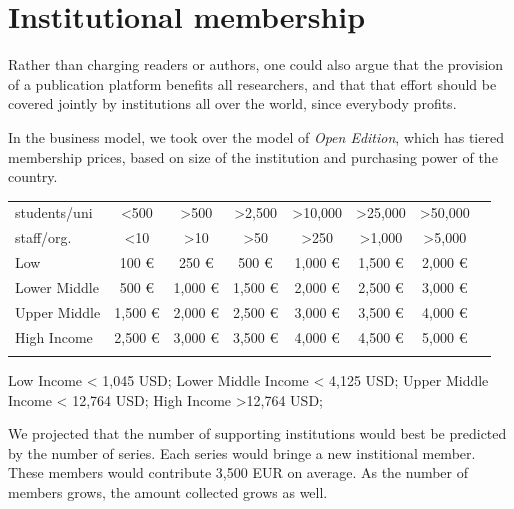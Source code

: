 \documentclass[nonflat,smallfont
]{langsci/langscibook}
\newcommand{\background}[1]{ 
  \vspace{5mm}
  \renewcommand{\tblslinecolour}{lsDarkBlue}
  \tblssy[red]{explore2}{Background}{\vspace*{-5mm}#1}
}
\newcommand{\langscisolution}[1]{
  \renewcommand{\tblslinecolour}{lsLightBlue}
  \tblssy{langsci}{LangSci solution}{\vspace*{-5mm}#1}
}
\renewcommand{\tblssy}[4][black!12]{%
  \renewcommand{\langscisymbol}{#2}\renewcommand{\tblsboxcolor}{#1}
  \begin{mdframed}[style=yellowexercise,frametitle={#3}]
    #4
  \end{mdframed}
}
\begin{document}
\section{Institutional membership} 
\vspace*{5mm}
\background{
Rather than charging readers or authors, one could also argue that the provision of a publication platform benefits all researchers, and that that effort should be covered jointly by institutions all over the world, since everybody profits. 
}
\langscisolution{
In the business model, we took over the model of \textit{Open Edition}, which has tiered membership prices, based on size of the institution and purchasing power of the country.

{\small
\noindent
\begin{tabularx}{\textwidth}{lSSSSSSS}  
    \lsptoprule
students/uni &<500 &>500&>2,500&>10,000&>25,000&>50,000\\
staff/org.&<10&>10&>50&>250&>1,000&>5,000\\
\midrule
Low         &100 €  &  250 €&  500 €&1,000 €&1,500 €&2,000 €\\
Lower Middle&500 €  &1,000 €&1,500 €&2,000 €&2,500 €&3,000 €\\
Upper Middle&1,500 €&2,000 €&2,500 €&3,000 €&3,500 €&4,000 €\\
High Income &2,500 €&3,000 €&3,500 €&4,000 €&4,500 €&5,000 €\\
\lspbottomrule
  \end{tabularx}
{\footnotesize 
  Low Income < 1,045 USD; Lower Middle Income < 4,125 USD; Upper Middle Income < 12,764 USD; High Income >12,764 USD;}
}

\medskip
We projected that the  number of supporting institutions would best be predicted by the number of series. Each series would bringe a new institional member. These members would contribute 3,500 EUR on average. As the number of members grows, the amount collected grows as well. 

}
\end{document}
